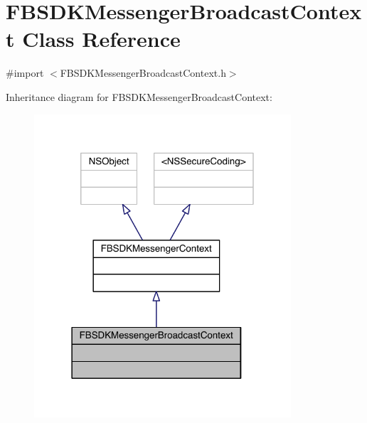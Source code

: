 \hypertarget{interface_f_b_s_d_k_messenger_broadcast_context}{\section{F\-B\-S\-D\-K\-Messenger\-Broadcast\-Context Class Reference}
\label{interface_f_b_s_d_k_messenger_broadcast_context}
}


{\ttfamily \#import $<$F\-B\-S\-D\-K\-Messenger\-Broadcast\-Context.\-h$>$}



Inheritance diagram for F\-B\-S\-D\-K\-Messenger\-Broadcast\-Context\-:
\nopagebreak
\begin{figure}[H]
\begin{center}
\leavevmode
\includegraphics[width=271pt]{interface_f_b_s_d_k_messenger_broadcast_context__inherit__graph}
\end{center}
\end{figure}


